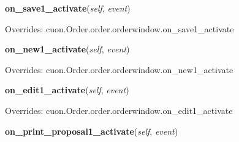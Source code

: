     \vspace{0.5ex}

\hspace{.8\funcindent}\begin{boxedminipage}{\funcwidth}

    \raggedright \textbf{on\_save1\_activate}(\textit{self}, \textit{event})

\setlength{\parskip}{2ex}
\setlength{\parskip}{1ex}
      Overrides: cuon.Order.order.orderwindow.on\_save1\_activate

    \end{boxedminipage}

    \vspace{0.5ex}

\hspace{.8\funcindent}\begin{boxedminipage}{\funcwidth}

    \raggedright \textbf{on\_new1\_activate}(\textit{self}, \textit{event})

\setlength{\parskip}{2ex}
\setlength{\parskip}{1ex}
      Overrides: cuon.Order.order.orderwindow.on\_new1\_activate

    \end{boxedminipage}

    \vspace{0.5ex}

\hspace{.8\funcindent}\begin{boxedminipage}{\funcwidth}

    \raggedright \textbf{on\_edit1\_activate}(\textit{self}, \textit{event})

\setlength{\parskip}{2ex}
\setlength{\parskip}{1ex}
      Overrides: cuon.Order.order.orderwindow.on\_edit1\_activate

    \end{boxedminipage}

    \label{cuon:Proposal:proposal:proposalwindow:on_print_proposal1_activate}

    \vspace{0.5ex}

\hspace{.8\funcindent}\begin{boxedminipage}{\funcwidth}

    \raggedright \textbf{on\_print\_proposal1\_activate}(\textit{self}, \textit{event})

\setlength{\parskip}{2ex}
\setlength{\parskip}{1ex}
    \end{boxedminipage}

